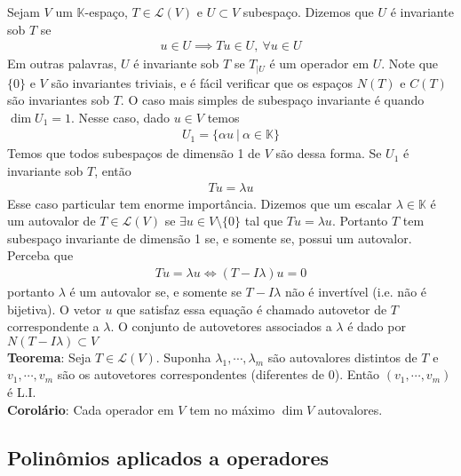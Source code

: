 \documentclass{article}
\newcommand{\K}{\mathbb{K}}
\begin{document}
Sejam $V$ um $\K$-espaço, $T \in \mathcal{L}(V)$ e $U \subset V$ subespaço. Dizemos que $U$ é invariante sob $T$ se
\begin{align*}
    u \in U \implies Tu \in U,\:\forall u \in U
\end{align*}
Em outras palavras, $U$ é invariante sob $T$ se $T_{\mid U}$ é um operador em $U$. Note que $\{0\}$ e $V$ são invariantes triviais, e é fácil verificar que os espaços $N(T)$ e $C(T)$ são invariantes sob $T$. O caso mais simples de subespaço invariante é quando $\dim U_1 = 1$. Nesse caso, dado $u \in V$ temos
\begin{align*}
    U_1 = \{\alpha u \: | \: \alpha \in \K \}
\end{align*}
Temos que todos subespaços de dimensão 1 de $V$ são dessa forma. Se $U_1$ é invariante sob $T$, então
\begin{align*}
    Tu = \lambda u
\end{align*}
Esse caso particular tem enorme importância. Dizemos que um escalar $\lambda \in \K$ é um autovalor de $T \in \mathcal{L}(V)$ se $\exists u \in V \setminus \{0\}$ tal que $Tu = \lambda u$. Portanto $T$ tem subespaço invariante de dimensão 1 se, e somente se, possui um autovalor. Perceba que
\begin{align*}
    Tu = \lambda u \iff (T - I\lambda)u = 0
\end{align*}
portanto $\lambda$ é um autovalor se, e somente se $T - I\lambda$ não é invertível (i.e. não é bijetiva). O vetor $u$ que satisfaz essa equação é chamado autovetor de $T$ correspondente a $\lambda$. O conjunto de autovetores associados a $\lambda$ é dado por $N(T - I\lambda) \subset V$ \vspace{3mm} \\
\textbf{Teorema}: Seja $T \in \mathcal{L}(V)$. Suponha $\lambda_1, \cdots, \lambda_m$ são autovalores distintos de $T$ e $v_1, \cdots, v_m$ são os autovetores correspondentes (diferentes de 0). Então $(v_1, \cdots, v_m)$ é L.I. \vspace{3mm} \\
\textbf{Corolário}: Cada operador em $V$ tem no máximo $\dim V$ autovalores. \vspace{3mm} \\

\subsection{Polinômios aplicados a operadores}
\end{document}
